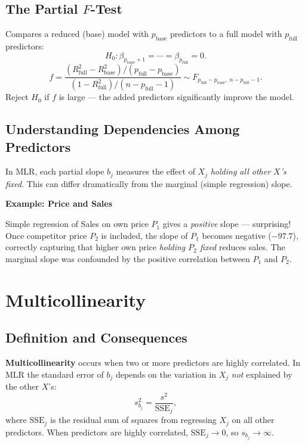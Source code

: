 \documentclass[12pt, a4paper]{article}
\begin{document}
\subsection{The Partial $F$-Test}

Compares a reduced (base) model with $p_\text{base}$ predictors to a full model with $p_\text{full}$ predictors:
\[
  H_0: \beta_{p_\text{base}+1} = \cdots = \beta_{p_\text{full}} = 0.
\]
\[
  f = \frac{(R^2_\text{full} - R^2_\text{base})/(p_\text{full}-p_\text{base})}{(1-R^2_\text{full})/(n-p_\text{full}-1)}
  \sim F_{p_\text{full}-p_\text{base},\;n-p_\text{full}-1}.
\]
Reject $H_0$ if $f$ is large — the added predictors significantly improve the model.

\subsection{Understanding Dependencies Among Predictors}

In MLR, each partial slope $b_j$ measures the effect of $X_j$ \emph{holding all other $X$'s fixed}. This can differ dramatically from the marginal (simple regression) slope.

\begin{examplebox}
\noindent\textbf{Example: Price and Sales}\par\smallskip
Simple regression of Sales on own price $P_1$ gives a \emph{positive} slope — surprising! Once competitor price $P_2$ is included, the slope of $P_1$ becomes negative ($-97.7$), correctly capturing that higher own price \emph{holding $P_2$ fixed} reduces sales. The marginal slope was confounded by the positive correlation between $P_1$ and $P_2$.
\end{examplebox}

\section{Multicollinearity}

\subsection{Definition and Consequences}

\textbf{Multicollinearity} occurs when two or more predictors are highly correlated. In MLR the standard error of $b_j$ depends on the variation in $X_j$ \emph{not} explained by the other $X$'s:
\[
  s_{b_j}^2 = \frac{s^2}{\text{SSE}_j},
\]
where $\text{SSE}_j$ is the residual sum of squares from regressing $X_j$ on all other predictors. When predictors are highly correlated, $\text{SSE}_j \to 0$, so $s_{b_j} \to \infty$.
\end{document}

